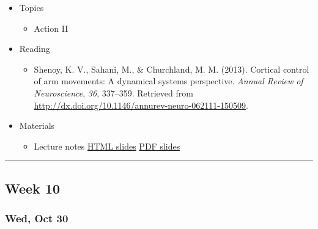 \documentclass[]{article}
\providecommand{\tightlist}{%
  \setlength{\itemsep}{0pt}\setlength{\parskip}{0pt}}
\begin{document}
\begin{itemize}
\tightlist
\item
  Topics

  \begin{itemize}
  \tightlist
  \item
    Action II
  \end{itemize}
\item
  Reading

  \begin{itemize}
  \tightlist
  \item
    Shenoy, K. V., Sahani, M., \& Churchland, M. M. (2013). Cortical
    control of arm movements: A dynamical systems perspective.
    \emph{Annual Review of Neuroscience}, \emph{36}, 337--359. Retrieved
    from \url{http://dx.doi.org/10.1146/annurev-neuro-062111-150509}.
  \end{itemize}
\item
  Materials

  \begin{itemize}
  \tightlist
  \item
    Lecture notes \textbar{} \href{}{HTML slides} \textbar{} \href{}{PDF
    slides}
  \end{itemize}
\end{itemize}

\begin{center}\rule{0.5\linewidth}{\linethickness}\end{center}

\hypertarget{week-10}{%
\subsection{Week 10}\label{week-10}}

\hypertarget{wed-oct-30}{%
\subsubsection{Wed, Oct 30}\label{wed-oct-30}}
\end{document}
